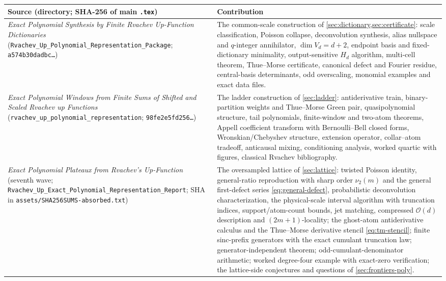 \documentclass[11pt,oneside]{article}
\numberwithin{equation}{section}
\theoremstyle{definition}
\theoremstyle{remark}
\newcommand{\bigO}{\mathcal O}
\newcommand{\vtwo}{\nu_2}
\begin{document}
\begin{center}
\small
\begin{tabular}{@{}p{}p{}@{}}
\toprule
Source (directory; SHA-256 of main \texttt{.tex}) & Contribution \\
\midrule
\emph{Exact Polynomial Synthesis by Finite Rvachev Up-Function
Dictionaries}
(\nolinkurl{Rvachev_Up_Polynomial_Representation_Package};
\texttt{a574b30dadbc\ldots})
& The common-scale construction of
\cref{sec:dictionary,sec:certificate}: scale classification, Poisson
collapse, deconvolution synthesis, alias nullspace and $q$-integer
annihilator, $\dim V_d=d+2$, endpoint basis and fixed-dictionary
minimality, output-sensitive $H_d$ algorithm, multi-cell theorem,
Thue--Morse certificate, canonical defect and Fourier residue,
central-basis determinants, odd overscaling, monomial examples and
exact data files. \\
\addlinespace
\emph{Exact Polynomial Windows from Finite Sums of Shifted and Scaled
Rvachev up Functions}
(\nolinkurl{rvachev_up_polynomial_representation};
\texttt{98fe2e5fd256\ldots})
& The ladder construction of \cref{sec:ladder}: antiderivative train,
binary-partition weights and Thue--Morse Green pair, quasipolynomial
structure, tail polynomials, finite-window and two-atom theorems,
Appell coefficient transform with Bernoulli--Bell closed forms,
Wronskian/Chebyshev structure, extension operator, collar--atom
tradeoff, anticausal mixing, conditioning analysis, worked quartic
with figures, classical Rvachev bibliography. \\
\addlinespace
\emph{Exact Polynomial Plateaux from Rvachev's Up-Function}
(seventh wave;
\nolinkurl{Rvachev_Up_Exact_Polynomial_Representation_Report};
SHA in \nolinkurl{assets/SHA256SUMS-absorbed.txt})
& The oversampled lattice of \cref{sec:lattice}: twisted Poisson
identity, general-ratio reproduction with sharp order
$\vtwo(m)$ and the general first-defect series
\eqref{eq:general-defect}, probabilistic deconvolution
characterization, the physical-scale interval algorithm with
truncation indices, support/atom-count bounds, jet matching,
compressed $\bigO(d)$ description and $(2m+1)$-locality; the
ghost-atom antiderivative calculus and the Thue--Morse derivative
stencil \eqref{eq:tm-stencil}; finite sinc-prefix generators with
the exact cumulant truncation law; generator-independent theorem;
odd-cumulant-denominator arithmetic; worked degree-four example with
exact-zero verification; the lattice-side conjectures and questions
of \cref{sec:frontiers-poly}. \\
\bottomrule
\end{tabular}
\end{center}
\end{document}
